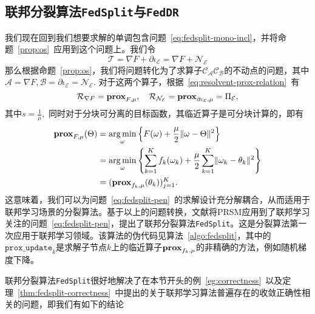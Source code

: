 \subsection{联邦分裂算法\texttt{FedSplit}与\texttt{FedDR}}
\label{subsec:chap2-os-fedsplit-feddr}

我们现在回到我们想要求解的单调包含问题~\eqref{eq:fedsplit-mono-incl}，并将命题~\ref{prop:os}~应用到这个问题上。我们令
\begin{equation}
\label{eq:fedsplit-operator}
\mathcal{T} = \nabla F + \partial \iota_{\mathcal{E}} = \nabla F + \mathcal{N}_{\mathcal{E}}
\end{equation}
那么根据命题~\ref{prop:os}，我们将问题转化为了求算子$\mathcal{C}_{\mathcal{A}} \mathcal{C}_{\mathcal{B}}$的不动点的问题，其中$\mathcal{A} = \nabla F, \mathcal{B} = \partial \iota_{\mathcal{E}} = \mathcal{N}_{\mathcal{E}}.$ 对于这两个算子，根据~\eqref{eq:resolvent-prox-relation}~有
\begin{equation*}
\mathcal{R}_{\nabla F} = \mathbf{prox}_{F, \mu}, \quad \mathcal{R}_{\mathcal{N}_{\mathcal{E}}} = \mathbf{prox}_{\partial \iota_{\mathcal{E}}, \mu} = \Pi_{\mathcal{E}},
\end{equation*}
其中$s = \frac{1}{\mu},$ 同时对于分块可分离的目标函数，其临近算子是可分块计算的，即有
\begin{align*}
\mathbf{prox}_{F, \mu}(\Theta) & = \operatorname*{arg\,min}_{\omega} \left\{ F(\omega) + \frac{\mu}{2} \lVert \omega - \Theta \rVert^2 \right\} \\
& = \operatorname*{arg\,min}_{\omega} \left\{ \sum_{k=1}^K f_k(\omega_k) + \frac{\mu}{2} \sum_{k=1}^K \lVert \omega_k - \theta_k \rVert^2 \right\} \\
& = (\mathbf{prox}_{f_k, \mu}(\theta_k))_{j=1}^K.
\end{align*}
这意味着，我们可以为问题~\eqref{eq:fedsplit-pen}~的求解设计充分解耦合，从而适用于联邦学习场景的分裂算法。基于以上的问题转换，文献\parencite{pathak2020fedsplit}将PRSM应用到了联邦学习关注的问题~\eqref{eq:fedsplit-pen}，提出了联邦分裂算法\texttt{FedSplit}。这是分裂算法第一次应用于联邦学习领域。该算法的伪代码见算法~\ref{algo:fedsplit}，其中的$\texttt{prox\_update}_k$是求解子节点$k$上的临近算子$\mathbf{prox}_{f_k, \mu}$的非精确的方法，例如随机梯度下降。



联邦分裂算法\texttt{FedSplit}很好地解决了在本节开头的例~\ref{eg:correctness}~以及定理~\ref{thm:fedsplit-correctness}~中提出的关于联邦学习算法普遍存在的收敛正确性相关的问题，即我们有如下的结论

